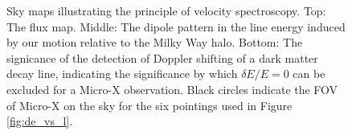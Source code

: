 \documentclass[aps,prd,10pt,twocolumn,superscriptaddress,showpacs]{revtex4-1}
\begin{document}
\begin{figure}[h!]
\begin{subfigure}[b]{1.0\columnwidth}
\end{subfigure}
\caption{Sky maps illustrating the principle of velocity spectroscopy. Top: The flux map. Middle:
	The dipole pattern in the line energy induced by our motion relative to the Milky Way halo.
	Bottom: The signicance of the detection of Doppler shifting of a dark matter decay line,
indicating the significance by which $\delta E/E=0$ can be excluded for a Micro-X
observation. Black circles indicate the
FOV of Micro-X on the sky for the six pointings used in Figure \ref{fig:de_vs_l}. }
\label{fig:skymaps}
\end{figure}



\end{document}
